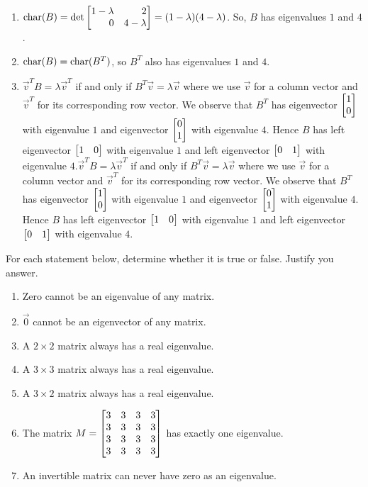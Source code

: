 \begin{exercises}
\begin{problist}
		\begin{solution}
		    \begin{enumerate}
		        \item  $\Char(B) = \det\mat{1 -\lambda & 2 \\ 0 & 4 - \lambda} = (1 - \lambda)(4 - \lambda)$. So, $B$ has eigenvalues $1$ and $4$.
		        \item $\operatorname{char}(B) = \operatorname{char}(B^T)$, so $B^T$ also has eigenvalues $1$ and $4$.
		        \item $\vec{v}^TB = \lambda \vec{v}^T$ if and only if $B^T \vec{v} = \lambda \vec{v}$ where we use $\vec{v}$ for a column vector and $\vec{v}^T$ for its corresponding row vector. We observe that $B^T$ has eigenvector $\mat{1 \\ 0}$ with eigenvalue $1$ and eigenvector $\mat{0\\1}$ with eigenvalue $4$. Hence $B$ has left eigenvector $\mat{1 & 0}$ with eigenvalue $1$ and left eigenvector $\mat{0 & 1}$ with eigenvalue $4$.$\vec{v}^TB = \lambda \vec{v}^T$ if and only if $B^T \vec{v} = \lambda \vec{v}$ where we use $\vec{v}$ for a column vector and $\vec{v}^T$ for its corresponding row vector. We observe that $B^T$ has eigenvector $\mat{1 \\ 0}$ with eigenvalue $1$ and eigenvector $\mat{0\\1}$ with eigenvalue $4$. Hence $B$ has left eigenvector $\mat{1 & 0}$ with eigenvalue $1$ and left eigenvector $\mat{0 & 1}$ with eigenvalue $4$.
		    \end{enumerate}
		\end{solution}

		\prob For each statement below, determine whether it is true or false. Justify you answer.
		\begin{enumerate}
			\item Zero cannot be an eigenvalue of any matrix.
			\item $\vec 0$ cannot be an eigenvector of any matrix.
			\item A $2\times 2$ matrix always has a real eigenvalue.
			\item A $3\times 3$ matrix always has a real eigenvalue.
			\item A $3\times 2$ matrix always has a real eigenvalue.
			\item The matrix $M = \mat{3&3&3&3\\3&3&3&3\\3&3&3&3\\3&3&3&3}$
				has exactly one eigenvalue.
			\item An invertible matrix can never have zero as an eigenvalue.
		\end{enumerate}
		

\end{problist}
\end{exercises}
